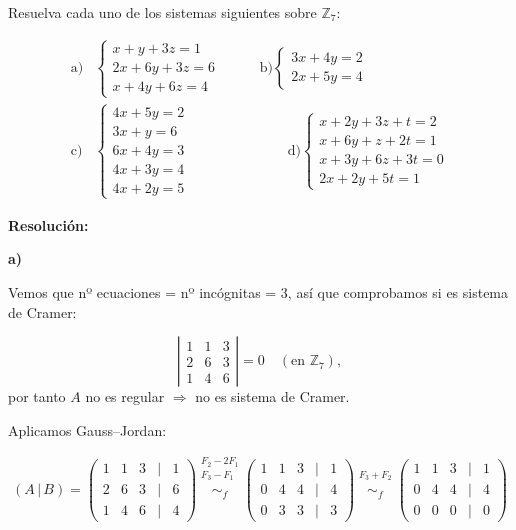\documentclass[a4paper,12pt]{article}
\begin{document}
\begin{ejercicio}[title=Ejercicio 26]
Resuelva cada uno de los sistemas siguientes sobre $\mathbb{Z}_7$:

\[
\begin{aligned}
\text{a)}&
\begin{cases}
x + y + 3z = 1\\
2x + 6y + 3z = 6\\
x + 4y + 6z = 4
\end{cases}
\qquad&
\text{b)}
\begin{cases}
3x + 4y = 2\\
2x + 5y = 4
\end{cases}
\\[1em]
\text{c)}&
\begin{cases}
4x + 5y = 2\\
3x + y = 6\\
6x + 4y = 3\\
4x + 3y = 4\\
4x + 2y = 5
\end{cases}
\qquad&\qquad
\text{d)}
\begin{cases}
x + 2y + 3z + t = 2\\
x + 6y + z + 2t = 1\\
x + 3y + 6z + 3t = 0\\
2x + 2y + 5t = 1
\end{cases}
\end{aligned}
\]

\tcblower
\textbf{Resolución:}

\textbf{a)}  

Vemos que nº ecuaciones = nº incógnitas = 3, así que comprobamos si es sistema de Cramer:

\[
\left|
\begin{matrix}
1 & 1 & 3\\
2 & 6 & 3\\
1 & 4 & 6
\end{matrix}
\right| = 0 \quad(\text{en } \mathbb{Z}_7),
\]
por tanto $A$ no es regular $\Rightarrow$ no es sistema de Cramer.

Aplicamos Gauss–Jordan:

\[
(A\,|\,B)=
\begin{pmatrix}
1 & 1 & 3 &\Big|& 1\\
2 & 6 & 3 &\Big|& 6\\
1 & 4 & 6 &\Big|& 4
\end{pmatrix}
\overset{\substack{F_2-2F_1\\F_3-F_1\\{}}}{\sim_f}
\begin{pmatrix}
1 & 1 & 3 &\Big|& 1\\
0 & 4 & 4 &\Big|& 4\\
0 & 3 & 3 &\Big|& 3
\end{pmatrix}
\overset{\substack{F_3+F_2\\{}}}{\sim_f}
\begin{pmatrix}
1 & 1 & 3 &\Big|& 1\\
0 & 4 & 4 &\Big|& 4\\
0 & 0 & 0 &\Big|& 0
\end{pmatrix}
\]


\end{ejercicio}
\end{document}
